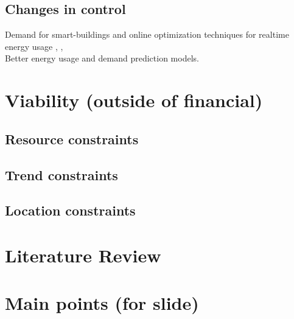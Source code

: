 \documentclass[plain]{article}
\newcommand{\1}{\mathbbm{1}}
\begin{document}
\subsection{Changes in control}
Demand for smart-buildings and online optimization techniques for realtime energy usage \cite{yu_review_2021}, \cite{khan_modeling_2022}, \cite{sembroiz_planning_2019} \\
Better energy usage and demand prediction models.

\section{Viability (outside of financial)}
\subsection{Resource constraints}
\subsection{Trend constraints}
\subsection{Location constraints}
\section{Literature Review}

\section{Main points (for slide)}


\end{document}
